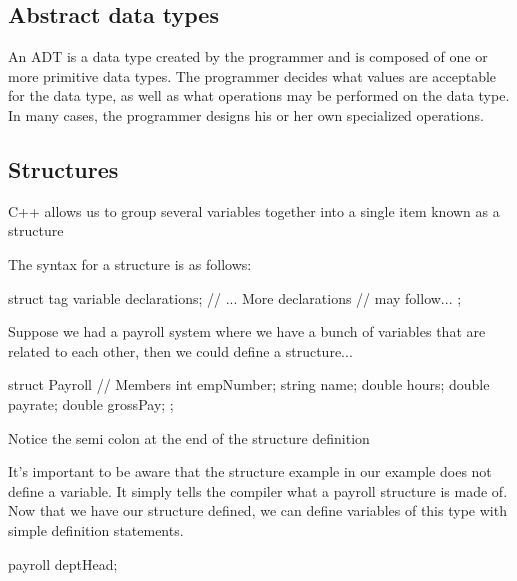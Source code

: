 \documentclass{report}
\begin{document}
	\bigbreak \noindent 
	\subsection{Abstract data types}
	\bigbreak \noindent 
	An ADT is a data type created by the programmer and is composed of one or more primitive data types. The programmer decides what values are acceptable for the data type, as well as what operations may be performed on the data type. In many cases, the programmer designs his or her own specialized operations.

	\bigbreak \noindent 
	\subsection{Structures}
	\bigbreak \noindent 
	\begin{concept}
	    C++ allows us to group several variables together into a single item known as a structure
	\end{concept}
	\bigbreak \noindent 
	The syntax for a structure is as follows:
	\bigbreak \noindent 
	
	\begin{cppcode}
struct tag {
    variable declarations;
    // ... More declarations 
    //     may follow...
};
	\end{cppcode}
	
	\bigbreak \noindent 
	Suppose we had a payroll system where we have a bunch of variables that are related to each other, then we could define a structure...
	\bigbreak \noindent 
	
	\begin{cppcode}
struct Payroll {
    // Members
    int empNumber;
    string name;
    double hours;
    double payrate;
    double grossPay;
};
	\end{cppcode}
	
	\bigbreak \noindent 
	\begin{notebox}
			Notice the semi colon at the end of the structure definition
		\end{notebox}

    \bigbreak \noindent 
	It's important to be aware that the structure example in our example does not define a variable. It simply tells the compiler what a payroll structure is made of.
	\bigbreak \noindent 
	Now that we have our structure defined, we can define variables of this type with simple definition statements.
	\bigbreak \noindent 
	
	\begin{cppcode}
payroll deptHead;
	\end{cppcode}
	
\end{document}
